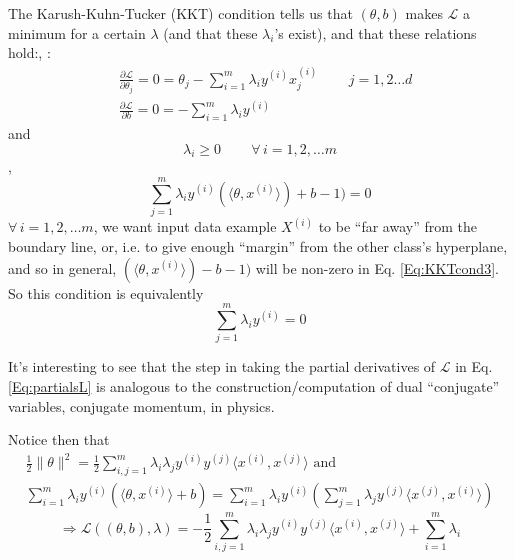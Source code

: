 \documentclass[10pt]{amsart}
\begin{document}
\begin{multicols*}{2}
The Karush-Kuhn-Tucker (KKT) condition tells us that $(\theta,b)$ makes $\mathcal{L}$ a minimum for a certain $\lambda$ (and that these $\lambda_i$'s exist), and that these relations hold:\cite{Nowa2008}, \cite{ChZa2013}:
\begin{equation}\label{Eq:partialsL}
  \begin{aligned}
    & \frac{ \partial \mathcal{L}}{ \partial \theta_j} = 0 = \theta_j - \sum_{i=1}^m \lambda_i y^{(i)} x_j^{(i)} \qquad \, j=1,2\dots d \\ 
    & \frac{ \partial \mathcal{L}}{ \partial b} = 0 = -\sum_{i=1}^m \lambda_i y^{(i)}
    \end{aligned}
\end{equation}
and
\begin{equation}
\lambda_i \geq 0 \qquad\, \forall \, i = 1, 2, \dots m
\end{equation},
\begin{equation}\label{Eq:KKTcond3}
\sum_{j=1}^m\lambda_iy^{(i)}(\langle \theta,x^{(i)}\rangle ) +b-1) = 0 
\end{equation}
$\forall \, i =1,2,\dots m$, we want input data example $X^{(i)}$ to be ``far away'' from the boundary line, or, i.e. to give enough ``margin'' from the other class's hyperplane, and so in general, $(\langle \theta,x^{(i)}\rangle ) -b-1)$ will be non-zero in Eq. \ref{Eq:KKTcond3}.  So this condition is equivalently
\begin{equation}
\sum_{j=1}^m\lambda_iy^{(i)} =0
  \end{equation}

It's interesting to see that the step in taking the partial derivatives of $\mathcal{L}$ in Eq. \ref{Eq:partialsL} is analogous to the construction/computation of dual ``conjugate'' variables, conjugate momentum, in physics.  

Notice then that
\begin{equation}
  \begin{gathered} \frac{1}{2} \| \theta \|^2 = \frac{1}{2} \sum_{i,j=1}^m \lambda_i \lambda_j y^{(i)} y^{(j)} \langle x^{(i)}, x^{(j)} \rangle \text{ and } \\
    \sum_{i=1}^m \lambda_i y^{(i)} (\langle \theta, x^{(i)} \rangle +b ) =\sum_{i=1}^m \lambda_i y^{(i)} (\sum_{j=1}^m \lambda_j y^{(j)} \langle x^{(j)}, x^{(i)} \rangle )
    \end{gathered}
  \end{equation}
\begin{equation}
\Longrightarrow \mathcal{L}((\theta,b),\lambda) = -\frac{1}{2} \sum_{i,j=1}^m \lambda_i \lambda_j y^{(i)} y^{(j)} \langle x^{(i)} , x^{(j)} \rangle + \sum_{i=1}^m \lambda_i
\end{equation}



\end{multicols*}
\end{document}
